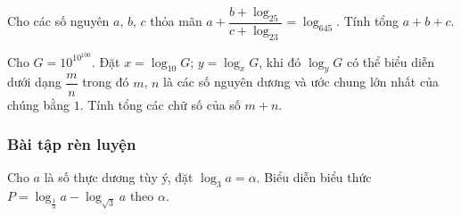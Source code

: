 \begin{vd}
	Cho các số nguyên $a,\,b,\,c$ thỏa mãn $a+\dfrac{b+\log_25}{c+\log_23}=\log_645$. Tính tổng $a+b+c$.
\end{vd}
\begin{vd}
	Cho $G=10^{10^{100}}$. Đặt $x=\log_{10} G$; $y=\log_x G$, khi đó $\log_y G$ có thể biểu diễn dưới dạng $\dfrac{m}{n}$ trong đó $m$, $n$ là các số nguyên dương và ước chung lớn nhất của chúng bằng $1$. Tính tổng các chữ số của số $m+n$.
\end{vd}

\subsubsection{Bài tập rèn luyện}
\begin{bt}
	Cho $a$ là số thực dương tùy ý, đặt $\log _{3} a=\alpha$. Biểu diễn biểu thức $P=\log _{\frac{1}{3}} a-\log _{\sqrt{3}} a$ theo $\alpha$.
\end{bt}

